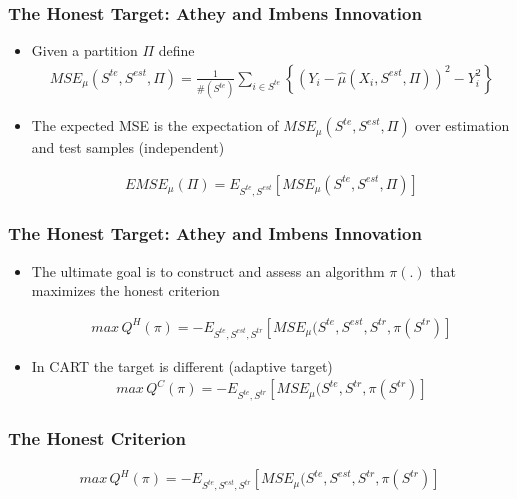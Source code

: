 \documentclass[
  shownotes,
  xcolor={svgnames},
  hyperref={colorlinks,citecolor=DarkBlue,linkcolor=DarkRed,urlcolor=DarkBlue}
  , aspectratio=169]{beamer}
\begin{document}
\begin{frame}[fragile]
\frametitle{The Honest Target: Athey and Imbens Innovation}

\begin{itemize}
\item Given a partition $\Pi$ define
\begin{align}
MSE_{\mu}(S^{te},S^{est},\Pi)=\frac{1}{\#(S^{te})}\sum_{i\in S^{te}}\left\{ \left(Y_{i}-\hat{\mu}(X_{i},S^{est},\Pi)\right)^{2}-Y_{i}^{2}\right\} 
\end{align}


\bigskip
\item The expected MSE is the expectation of $MSE_{\mu}(S^{te},S^{est},\Pi)$ over estimation and test samples (independent)

\begin{align}
EMSE_{\mu}(\Pi)=E_{S^{te},S^{est}}\left[MSE_{\mu}(S^{te},S^{est},\Pi)\right]
\end{align}


\end{itemize}

\end{frame}
\begin{frame}[fragile]
\frametitle{The Honest Target: Athey and Imbens Innovation}


\begin{itemize}
\item The ultimate goal is to construct and assess an algorithm $\pi(.)$ that maximizes the honest criterion

\medskip
\begin{align}
max\,Q^{H}(\pi)=-E_{S^{te},S^{est},S^{tr}}\left[MSE_{\mu}(S^{te},S^{est},S^{tr},\pi(S^{tr})\right]
\end{align}


\item In CART the target is different (adaptive target)
\medskip
\begin{align}
max\,Q^{C}(\pi)=-E_{S^{te},S^{tr}}\left[MSE_{\mu}(S^{te},S^{tr},\pi(S^{tr})\right]
\end{align}


\end{itemize}
\end{frame}
\begin{frame}[fragile]
\frametitle{The Honest Criterion}

\begin{align}
max\,Q^{H}(\pi)=-E_{S^{te},S^{est},S^{tr}}\left[MSE_{\mu}(S^{te},S^{est},S^{tr},\pi(S^{tr})\right]
\end{align}
\bigskip

$\,$ \\
\bigskip

$\,$\\
\bigskip

$\,$\\
\bigskip
\end{frame}
\end{document}
